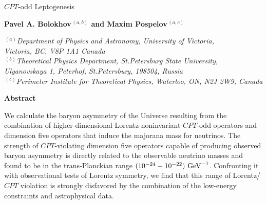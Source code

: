 \documentclass[12pt]{revtex4}
\begin{document}
\begin{titlepage}
\renewcommand{\thefootnote}{\fnsymbol{footnote}}

\setcounter{page}{1}

\vspace*{0.2in}

\begin{center}

\hspace*{-0.6cm}\parbox{17.5cm}{\Large \bf \begin{center}
$CPT$-odd Leptogenesis\end{center}}

\vspace*{0.5cm}
\normalsize


{\bf Pavel A. Bolokhov$^{\,(a,b)}$ and Maxim Pospelov$^{\,(a,c)}$ }



\smallskip
\medskip

$^{\,(a)}${\it Department of Physics and Astronomy, University of Victoria, \\
     Victoria, BC, V8P 1A1 Canada} \\
$^{\,(b)}${\it Theoretical Physics Department, St.Petersburg State University, Ulyanovskaya 1,
        Peterhof, St.Petersburg, 198504, Russia}\\
$^{\,(c)}${\it Perimeter Institute for Theoretical Physics, Waterloo,
ON, N2J 2W9, Canada}

\smallskip
\end{center}
\vskip0.2in


\centerline{\large\bf Abstract}

We calculate the baryon asymmetry of the Universe resulting from 
the combination of higher-dimensional Lorentz-noninvariant $CPT$-odd operators and 
dimension five operators that induce the majorana mass for neutrinos.
The strength of $CPT$-violating dimension five operators
capable of producing observed baryon asymmetry is directly 
related to the observable neutrino masses and found to be in 
the trans-Planckian range $(10^{-24}-10^{-22})~{\rm GeV}^{-1}$. Confronting it 
with observational tests of 
Lorentz symmetry, we find that this range of  Lorentz/$CPT$ violation 
 is strongly disfavored by the combination of the low-energy constraints and astrophysical 
data.  


\vfil
{}

\end{titlepage}
\end{document}
